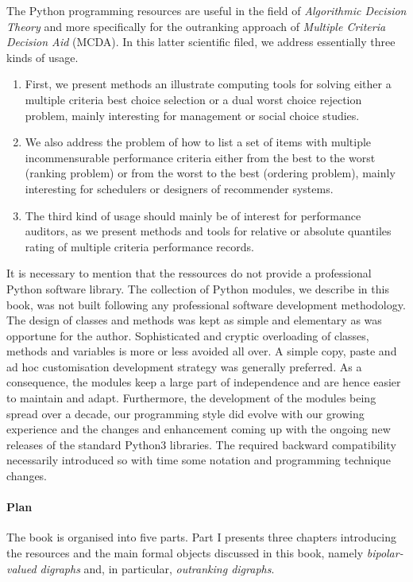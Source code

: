 The \Digraph Python programming resources are useful in the field of \emph{Algorithmic Decision Theory} and more specifically for the outranking approach of \emph{Multiple Criteria Decision Aid} (MCDA). In this latter scientific filed, we address essentially three kinds of usage.
\begin{enumerate}[nosep]
\item First, we present methods an illustrate computing tools for solving either a multiple criteria best choice selection or a dual worst choice rejection problem, mainly interesting for management or social choice studies.
\item We also address the problem of how to list a set of items with multiple incommensurable performance criteria either from the best to the worst (ranking problem) or from the worst to the best (ordering problem), mainly interesting for schedulers or designers of recommender systems.
\item The third kind of usage should mainly be of interest for performance auditors, as we present methods and tools for relative or absolute quantiles rating of multiple criteria performance records. 
\end{enumerate}

It is necessary to mention that the \Digraph ressources do not provide a professional Python software library. The collection of Python modules, we describe in this book, was not built following any professional software development methodology. The design of classes and methods was kept as simple and elementary as was opportune for the author. Sophisticated and cryptic overloading of classes, methods and variables is more or less avoided all over. A simple copy, paste and ad hoc customisation development strategy was generally preferred. As a consequence, the \Digraph modules keep a large part of independence and are hence easier to maintain and adapt.  Furthermore, the development of the \Digraph modules being spread over a decade, our programming style did evolve with our growing experience and the changes and enhancement coming up with the ongoing new releases of the standard Python3 libraries. The required backward compatibility necessarily introduced so with time some notation and programming technique changes.

\paragraph{Plan}

\noindent The book is organised into five parts. Part I presents three chapters introducing the \Digraph resources and the main formal objects discussed in this book, namely \emph{bipolar-valued digraphs} and, in particular, \emph{outranking digraphs}.

